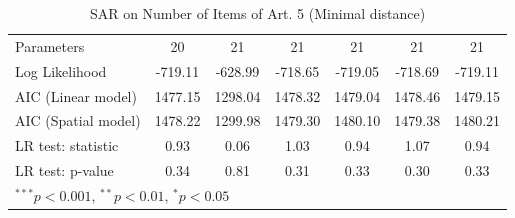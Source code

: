 \begin{table}[!h]
\begin{center}
\begin{tabular}{l c c c c c c }
Parameters              & 20           & 21           & 21           & 21           & 21           & 21           \\
Log Likelihood          & -719.11      & -628.99      & -718.65      & -719.05      & -718.69      & -719.11      \\
AIC (Linear model)      & 1477.15      & 1298.04      & 1478.32      & 1479.04      & 1478.46      & 1479.15      \\
AIC (Spatial model)     & 1478.22      & 1299.98      & 1479.30      & 1480.10      & 1479.38      & 1480.21      \\
LR test: statistic      & 0.93         & 0.06         & 1.03         & 0.94         & 1.07         & 0.94         \\
LR test: p-value        & 0.34         & 0.81         & 0.31         & 0.33         & 0.30         & 0.33         \\
\bottomrule
\multicolumn{7}{l}{\scriptsize{$^{***}p<0.001$, $^{**}p<0.01$, $^*p<0.05$}}
\end{tabular}
\caption{SAR on Number of Items of Art. 5 (Minimal distance)}
\label{table:coefficients}
\end{center}
\end{table}

